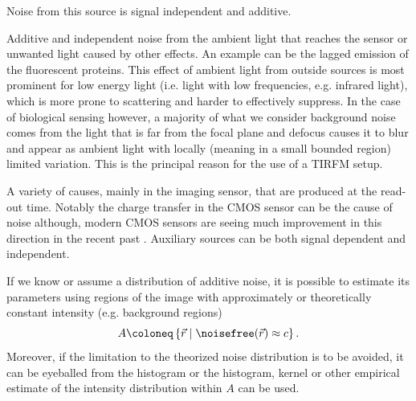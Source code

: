 \begin{description}
        Noise from this source is signal independent and additive.
    \item[Background noise]
        Additive and independent noise from the ambient light that reaches the sensor or unwanted light caused by other
            effects.
        An example can be the lagged emission of the fluorescent proteins.
        This effect of ambient light from outside sources is most prominent for low energy light (i.e. light with low 
            frequencies, e.g. infrared light), which is more prone to scattering and harder to effectively suppress.
        In the case of biological sensing however, a majority of what we consider background noise comes from the light 
            that is far from the focal plane and defocus causes it to blur and appear as ambient light with locally 
            (meaning in a small bounded region) limited variation.
        This is the principal reason for the use of a \ac{TIRFM} setup.
    \item[Auxiliary sources]
        A variety of causes, mainly in the imaging sensor, that are produced at the read-out time.
        Notably the charge transfer in the \ac{CMOS} sensor can be the cause of noise although, modern \ac{CMOS} sensors
            are seeing much improvement in this direction in the recent past .
        Auxiliary sources can be both signal dependent and independent.
\end{description}

If we know or assume a distribution of additive noise, it is possible to estimate its parameters using regions of the
    image with approximately or theoretically constant intensity (e.g. background regions)
    \begin{equation*}
        A \coloneq \left\{ \vec{r} \mid \noisefree(\vec{r}) \approx c  \right\}.
    \end{equation*}
Moreover, if the limitation to the theorized noise distribution is to be avoided, it can be eyeballed from the histogram
    or the histogram, kernel or other empirical estimate of the intensity distribution within \(A\) can be used.

